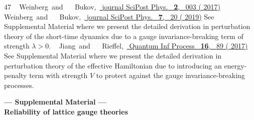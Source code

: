 \documentclass[aps,prl,reprint,twocolumn,superscriptaddress,floatfix,nofootinbib]{revtex4-1}
\begin{document}
\begin{thebibliography}{47}
	\BibitemOpen
	 { {~\bibnamefont
			{Weinberg}}\ and\  {~\bibnamefont
			{Bukov}},\ }\href {\doibase 10.21468/SciPostPhys.2.1.003} {\bibfield
		{journal} { {SciPost Phys.}\ }\textbf {
			{2}},\  {003} ( {2017})}%
	\BibitemOpen
	 { {~\bibnamefont
			{Weinberg}}\ and\  {~\bibnamefont
			{Bukov}},\ }\href {\doibase 10.21468/SciPostPhys.7.2.020} {\bibfield
		{journal} { {SciPost Phys.}\ }\textbf {
			{7}},\  {20} ( {2019})}%
	\BibitemOpen
	\href@noop {} {} {See Supplemental Material where we
		present the detailed derivation in perturbation theory of the short-time
		dynamics due to a gauge invariance-breaking term of strength
		$\lambda>0$.}%
	\BibitemOpen
	 { {~\bibnamefont
			{Jiang}}\ and\  {\ \bibnamefont
			{Rieffel}},\ }\href {\doibase https://doi.org/10.1007/s11128-017-1527-9}
	{ { {Quantum Inf Process}\ }\textbf
		{ {16}},\  {89} (
		{2017})}%
	\BibitemOpen
	\href@noop {} {} {See Supplemental Material where we
		present the detailed derivation in perturbation theory of the effective
		Hamiltonian due to introducing an energy-penalty term with strength $V$ to
		protect against the gauge invariance-breaking processes.}%
\end{thebibliography}

\newpage
\bigskip
\pagebreak
\widetext
\begin{center}
	\textbf{\large --- Supplemental Material ---\\ Reliability of lattice gauge theories}\\
	\medskip
\end{center}
\setcounter{equation}{0}
\setcounter{figure}{0}
\setcounter{table}{0}
\makeatletter
\renewcommand{\theequation}{S\arabic{equation}}
\renewcommand{\thefigure}{S\arabic{figure}}
\renewcommand{\bibnumfmt}[1]{[S#1]}
\renewcommand{\citenumfont}[1]{S#1}
\newcommand{\rmf}{{\rm f}}
\end{document}
